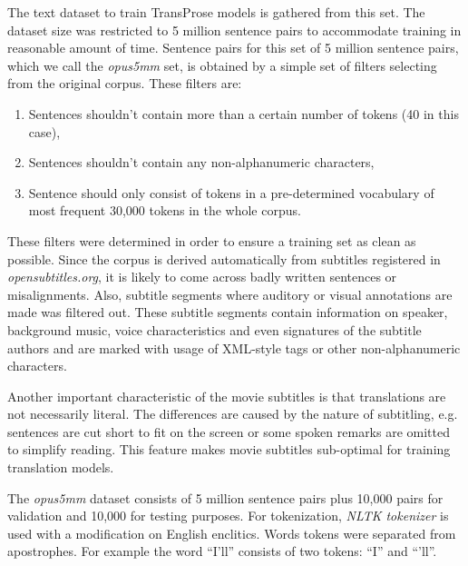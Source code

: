 The text dataset to train TransProse models is gathered from this set. The dataset size was restricted to 5 million sentence pairs to accommodate training in reasonable amount of time. Sentence pairs for this set of 5 million sentence pairs, which we call the \textit{opus5mm} set, is obtained by a simple set of filters selecting from the original corpus. These filters are: 

\begin{enumerate}
    \item Sentences shouldn't contain more than a certain number of tokens (40 in this case),
    \item Sentences shouldn't contain any non-alphanumeric characters,
    \item Sentence should only consist of tokens in a pre-determined vocabulary of most frequent 30,000 tokens in the whole corpus.
\end{enumerate}

These filters were determined in order to ensure a training set as clean as possible. Since the corpus is derived automatically from subtitles registered in \textit{opensubtitles.org}, it is likely to come across badly written sentences or misalignments. Also, subtitle segments where auditory or visual annotations are made was filtered out. These subtitle segments contain information on speaker, background music, voice characteristics and even signatures of the subtitle authors and are marked with usage of XML-style tags or other non-alphanumeric characters. 

Another important characteristic of the movie subtitles is that translations are not necessarily literal. The differences are caused by the nature of subtitling, e.g. sentences are cut short to fit on the screen or some spoken remarks are omitted to simplify reading. This feature makes movie subtitles sub-optimal for training translation models. 

The \textit{opus5mm} dataset consists of 5 million sentence pairs plus 10,000 pairs for validation and 10,000 for testing purposes. For tokenization, \textit{NLTK tokenizer} \citep{nltk} is used with a modification on English enclitics. Words tokens were separated from apostrophes. For example the word ``I'll'' consists of two tokens: ``I'' and ``'ll''. 

